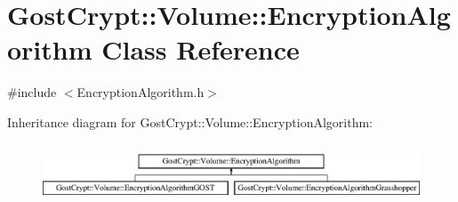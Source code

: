 \hypertarget{class_gost_crypt_1_1_volume_1_1_encryption_algorithm}{}\section{Gost\+Crypt\+:\+:Volume\+:\+:Encryption\+Algorithm Class Reference}
\label{class_gost_crypt_1_1_volume_1_1_encryption_algorithm}


{\ttfamily \#include $<$Encryption\+Algorithm.\+h$>$}

Inheritance diagram for Gost\+Crypt\+:\+:Volume\+:\+:Encryption\+Algorithm\+:\begin{figure}[H]
\begin{center}
\leavevmode
\includegraphics[height=1.766562cm]{class_gost_crypt_1_1_volume_1_1_encryption_algorithm}
\end{center}
\end{figure}
